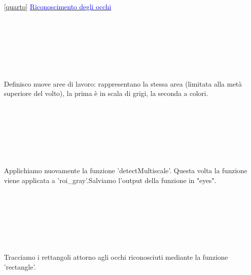 \documentclass[12pt]{article}
\begin{document}
{  	
\ref {quarto} \underline{\textcolor{blue}{Riconoscimento degli occhi}}
  	\\
  	\\
  	\\
  	\\ 
    \\
    \\
    \\
    \\
   Definisco nuove aree di lavoro: rappresentano la stessa area (limitata alla metà superiore del volto), la prima è in scala di grigi, la seconda a colori.
    \\
    \\
    \\
    \\
  	\\
  	\\
  	\\
  	\\
  	Applichiamo nuovamente la funzione 'detectMultiscale'. Questa volta la funzione viene applicata a 'roi\_gray'.Salviamo l'output della funzione in "eyes".
  	\\
  	\\
  	\\
  	\\
  	\\
  	\\
  	\\
  	\\
  	Tracciamo i rettangoli attorno agli occhi riconosciuti mediante la funzione 'rectangle'.
 \pagebreak
  	 	
}
\end{document}
